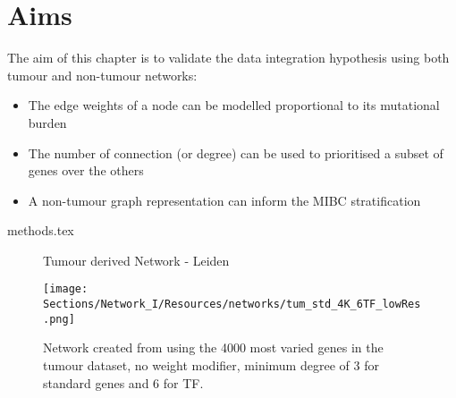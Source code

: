 

\section{Aims}

The aim of this chapter is to validate the data integration hypothesis using both tumour and non-tumour networks:

\begin{itemize}
    \item The edge weights of a node can be modelled proportional to its mutational burden
    \item The number of connection (or degree) can be used to prioritised a subset of genes over the others
    \item A non-tumour graph representation can inform the MIBC stratification 
\end{itemize}


{methods.tex}

\newpage
{}
\begin{figure}[p]
  \thispagestyle{empty} %
  \centering
  \captionsetup{justification=centering, labelfont=bf}
    \parbox{\textwidth}{\centering \Huge Tumour derived Network - Leiden} %
  \vspace{3cm} 
  \texttt{[image: Sections/Network\_I/Resources/networks/tum\_std\_4K\_6TF\_lowRes.png]} %
  \parbox{0.8\textwidth}{\centering Network created from using the 4000 most varied genes in the tumour dataset, no weight modifier, minimum degree of 3 for standard genes and 6 for TF.}
\end{figure}
\restoregeometry
\newpage


